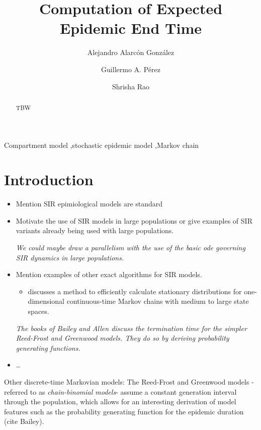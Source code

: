 \documentclass[a4paper,preprint]{elsarticle}
\begin{document}
\title{Computation of Expected Epidemic End Time}

\author[1]{Alejandro Alarc\'on Gonz\'alez}
\author[1]{Guillermo A. P\'erez}
\author[1]{Shrisha Rao}

\begin{abstract}
  TBW
\end{abstract}

\begin{keyword}
  Compartment model \sep stochastic epidemic model \sep Markov chain
\end{keyword}

\maketitle

\section{Introduction}
\begin{itemize}
    \item Mention SIR epimiological models are standard
    \item Motivate the use of SIR models in large populations or give examples of SIR variants already being used with large populations.
    
    \textit{We could maybe draw a parallelism with the use of the basic ode governing SIR dynamics in large populations.}
    \item Mention examples of other exact algorithms for SIR models.
    \begin{itemize}
        \item \cite{KEELING2009133} discusses a method to efficiently calculate stationary distributions for one-dimensional continuous-time Markov chains with medium to large state spaces.
    \end{itemize}
    \textit{The books of Bailey and Allen discuss the termination time for the simpler Reed-Frost and Greenwood models. They do so by deriving probability generating functions.} 
    \item \dots
\end{itemize}

Other discrete-time Markovian models: The Reed-Frost and Greenwood models -referred to as \textit{chain-binomial models}- assume a constant generation interval through the population, which allows for an interesting derivation of model features such as the probability generating function for the epidemic duration (cite Bailey).  
\end{document}
